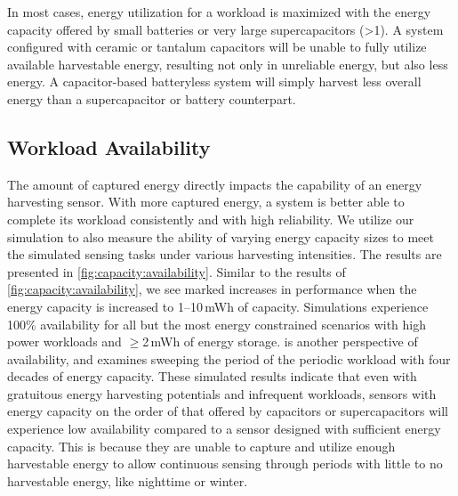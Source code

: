 In most cases, energy utilization for a workload is maximized with the energy capacity offered by small batteries or very large supercapacitors (\textgreater 1\ssi{\farad}).
A system configured with ceramic or tantalum capacitors will be unable to fully utilize available harvestable energy, resulting not only in unreliable energy, but also less energy. 
A capacitor-based batteryless system will simply harvest less overall energy than a supercapacitor or battery counterpart. 


\subsection{Workload Availability}
\label{sec:capacity:availability}

The amount of captured energy directly impacts the capability of an energy harvesting sensor. With more captured energy, a system is better able to complete its workload consistently and with high reliability. 
We utilize our simulation to also measure the ability of varying energy capacity sizes to meet the simulated 
sensing tasks under various harvesting intensities. 
The results are
presented in \cref{fig:capacity:availability}. 
Similar to the results of \cref{fig:capacity:availability}, we see marked
increases in performance when the energy capacity is increased to 1--10\,mWh
of capacity.
Simulations experience 100\% availability for all but
the most energy constrained scenarios with high power workloads and
$\geq$2\,mWh of energy storage.
 is another perspective of availability, and examines sweeping the period of the periodic workload with four decades of energy capacity.
These simulated results indicate that even 
with gratuitous energy harvesting potentials and infrequent workloads, sensors with energy capacity on the order of that offered by capacitors or supercapacitors will experience low availability compared to a sensor designed with sufficient energy capacity.
This is because they are
unable to capture and utilize enough harvestable energy to allow continuous sensing through periods with little to no harvestable energy, like nighttime or winter. 

